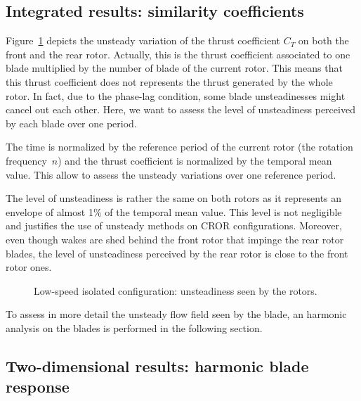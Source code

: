 
\subsection{Integrated results: similarity coefficients}
\label{sub:dream_ls_hb_sim_coeff}

Figure~\ref{fig:dream_ls_hb_unst_coeff} depicts the
unsteady variation of the thrust coefficient $C_T$ on 
both the front and the rear rotor. Actually, this is the
thrust coefficient associated to one blade multiplied by the
number of blade of the current rotor. This means that this
thrust coefficient does not represents the thrust generated
by the whole rotor. In fact, due to the phase-lag condition,
some blade unsteadinesses might cancel out each other.
Here, we want to assess the level of unsteadiness perceived by each blade
over one period.

The time is 
normalized by the reference period of the current rotor 
(the rotation frequency~$n$) and the thrust coefficient is normalized
by the temporal mean value. This allow to assess the unsteady variations
over one reference period. 


The level of unsteadiness is rather
the same on both rotors as it represents an envelope of almost
1\% of the temporal mean value. This level is not negligible and
justifies the use of unsteady methods on CROR configurations. 
Moreover, even though wakes are shed behind the front rotor
that impinge the rear rotor blades, the level of unsteadiness
perceived by the rear rotor is close to the front rotor ones.
\begin{figure}[htp]
  \centering
  \caption{Low-speed isolated configuration: unsteadiness seen by the rotors.}
  \label{fig:dream_ls_hb_unst_coeff}
\end{figure}

To assess in more detail the unsteady flow
field seen by the blade, an harmonic analysis on the
blades is performed in the following section.

\subsection{Two-dimensional results: harmonic blade response}
\label{sub:dream_ls_hb_blade_response}

